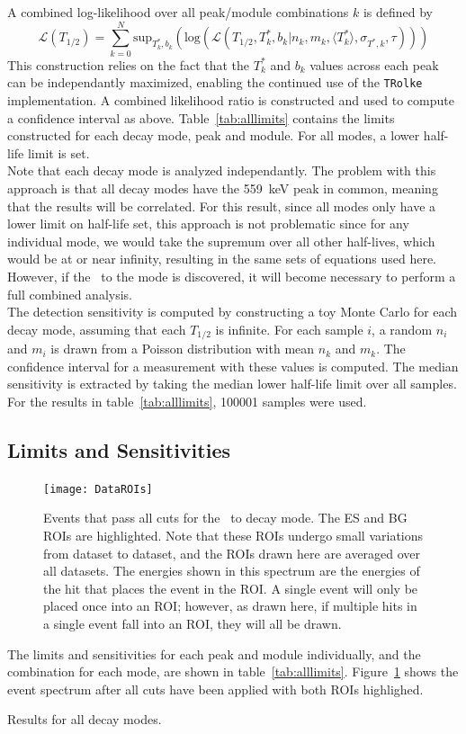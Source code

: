\documentclass[/main.tex]{subfiles}
\begin{document}
A combined log-likelihood over all peak/module combinations $k$ is defined by
\begin{equation}
  \mathcal{L}(T_{1/2}) = \sum_{k=0}^{N} \mathrm{sup}_{T^*_k,b_k}(\mathrm{log}(\mathcal{L}(T_{1/2},T^*_k,b_k|n_k,m_k,\langle T^*_k\rangle, \sigma_{T^*,k},\tau)))
\end{equation}
This construction relies on the fact that the $T^*_k$ and $b_k$ values across each peak can be independantly maximized, enabling the continued use of the \texttt{TRolke} implementation.
A combined likelihood ratio is constructed and used to compute a confidence interval as above.
Table~\ref{tab:alllimits} contains the limits constructed for each decay mode, peak and module.
For all modes, a lower half-life limit is set.
\\
Note that each decay mode is analyzed independantly.
The problem with this approach is that all decay modes have the 559~keV peak in common, meaning that the results will be correlated.
For this result, since all modes only have a lower limit on half-life set, this approach is not problematic since for any individual mode, we would take the supremum over all other half-lives, which would be at or near infinity, resulting in the same sets of equations used here.
However, if the \bbes\ to the  mode is discovered, it will become necessary to perform a full combined analysis.
\\
The detection sensitivity is computed by constructing a toy Monte Carlo for each decay mode, assuming that each $T_{1/2}$ is infinite.
For each sample $i$, a random $n_i$ and $m_i$ is drawn from a Poisson distribution with mean $n_k$ and $m_k$.
The confidence interval for a measurement with these values is computed.
The median sensitivity is extracted by taking the median lower half-life limit over all samples.
For the results in table~\ref{tab:alllimits}, 100001 samples were used.
\\
\subsection{Limits and Sensitivities}
\begin{figure}[h]
  \centering
  \texttt{[image: DataROIs]}
  \caption[Measured events after all cuts with ROIs drawn]{\label{fig:roievents}
    Events that pass all cuts for the \tnbb\ to  decay mode. The ES and BG ROIs are highlighted. Note that these ROIs undergo small variations from dataset to dataset, and the ROIs drawn here are averaged over all datasets. The energies shown in this spectrum are the energies of the hit that places the event in the ROI. A single event will only be placed once into an ROI; however, as drawn here, if multiple hits in a single event fall into an ROI, they will all be drawn.
  }
\end{figure}
The limits and sensitivities for each peak and module individually, and the combination for each mode, are shown in table~\ref{tab:alllimits}.
Figure~\ref{fig:roievents} shows the event spectrum after all cuts have been applied with both ROIs highlighed.

\begin{table}[h]
  \footnotesize
  \centering
  
  \caption[Final results for all decay modes]{ \label{tab:alllimits}
    Results for all decay modes.
  }
\end{table}

\onlyinsubfile{
  
  
}
\end{document}
